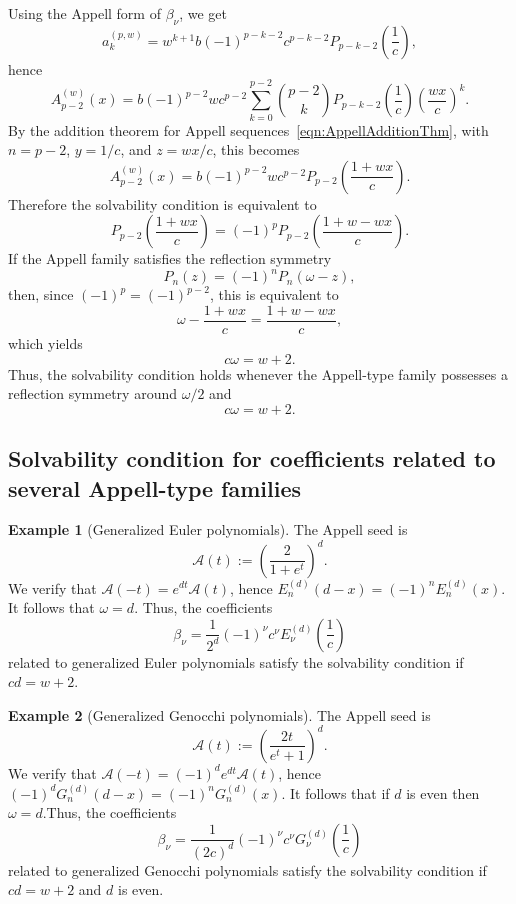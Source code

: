 \documentclass[10pt,reqno,a4paper]{amsart}%
\theoremstyle{definition}
\newtheorem{example}{Example}
\newcommand{\ap}{\ensuremath{\mathcal{A}}}%
\begin{document}
Using the Appell form of $\beta_{\nu}$, we get
\[
a_{k}^{(p,w)}=w^{k+1}b(-1)^{p-k-2}c^{p-k-2}P_{p-k-2}\!\left(  \frac{1}%
{c}\right)  ,
\]
hence
\[
A_{p-2}^{(w)}(x)=b(-1)^{p-2}wc^{p-2}\sum_{k=0}^{p-2}\binom{p-2}{k}%
P_{p-k-2}\!\left(  \frac{1}{c}\right)  \left(  \frac{wx}{c}\right)  ^{k}.
\]
By the addition theorem for Appell sequences~\eqref{eqn:AppellAdditionThm},
with $n=p-2$, $y=1/c$, and $z=wx/c$, this becomes
\[
A_{p-2}^{(w)}(x)=b(-1)^{p-2}wc^{p-2}P_{p-2}\!\left(  \frac{1+wx}{c}\right)  .
\]
Therefore the solvability condition is equivalent to
\[
P_{p-2}\!\left(  \frac{1+wx}{c}\right)  =(-1)^{p}P_{p-2}\!\left(
\frac{1+w-wx}{c}\right)  .
\]
If the Appell family satisfies the reflection symmetry
\[
P_{n}(z)=(-1)^{n}P_{n}(\omega-z),
\]
then, since $(-1)^{p}=(-1)^{p-2}$, this is equivalent to
\[
\omega-\frac{1+wx}{c}=\frac{1+w-wx}{c},
\]
which yields
\[
c\omega=w+2.
\]
Thus, the solvability condition holds whenever the Appell-type family
possesses a reflection symmetry around $\omega/2$ and
\[
c\omega=w+2.
\]


\subsection{Solvability condition for coefficients related to several
Appell-type families}

\begin{example}
[Generalized Euler polynomials]\label{ex:GenEulerPoly} The Appell seed is
\[
\ap(t):=\left(  \frac{2}{1+e^{t}}\right)  ^{d}.
\]
We verify that $\ap(-t)=e^{dt}\ap(t)$, hence $E_{n}^{\left(
d\right)  }\left(  d-x\right)  =\left(  -1\right)  ^{n}E_{n}^{\left(
d\right)  }\left(  x\right)  .\ $It follows that $\omega=d$. \newline Thus,
the coefficients
\[
\beta_{\nu}=\frac{1}{2^{d}}(-1)^{\nu}c^{\nu}E_{\nu}^{(d)}\!\left(  \frac{1}%
{c}\right)
\]
related to generalized Euler polynomials satisfy the solvability condition if
$cd=w+2$.
\end{example}

\begin{example}
[Generalized Genocchi polynomials]The Appell seed is
\[
\ap(t):=\left(  \frac{2t}{e^{t}+1}\right)  ^{d}.
\]
We verify that $\ap(-t)=(-1)^{d}e^{dt}\ap(t)$, hence $\left(
-1\right)  ^{d}G_{n}^{\left(  d\right)  }\left(  d-x\right)  =\left(
-1\right)  ^{n}G_{n}^{\left(  d\right)  }\left(  x\right)  .$ It follows that
if $d$ is even then $\omega=d$.\newline Thus, the coefficients
\[
\beta_{\nu}=\frac{1}{(2c)^{d}}(-1)^{\nu}c^{\nu}G_{\nu}^{(d)}\!\left(  \frac
{1}{c}\right)
\]
related to generalized Genocchi polynomials satisfy the solvability condition
if $cd=w+2$ and $d$ is even.
\end{example}
\end{document}
